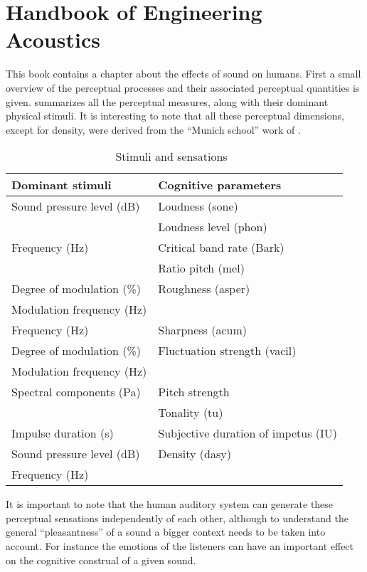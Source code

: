 \documentclass%
  [/Users/rodrigo/Documents/TUe/thesis/latex/topic/fluctuation_strength/
  literature_review.tex]
  {subfiles}
\begin{document}
\section{Handbook of Engineering Acoustics}

This book contains a chapter about the effects of sound on humans. First a small
overview of the perceptual processes and their associated perceptual quantities
is given.  summarizes all the perceptual measures, along with
their dominant physical stimuli. It is interesting to note that all these
perceptual dimensions, except for density, were derived from the
``Munich school'' work of \citet{Fastl2007Psychoacoustics}.

\begin{table}[ht]
  \centering
  \begin{tabular}{ l l }
    \toprule
    \textbf{Dominant stimuli} & \textbf{Cognitive parameters} \\
    \midrule
    Sound pressure level (dB) & Loudness (sone) \\
    \cmidrule{2-2}
    & Loudness level (phon) \\
    \midrule
    Frequency (Hz) & Critical band rate (Bark) \\
    \cmidrule{2-2}
    & Ratio pitch (mel) \\
    \midrule
    Degree of modulation (\%) & Roughness (asper)\\
    \cmidrule{1-1}
    Modulation frequency (Hz) & \\
    \midrule
    Frequency (Hz) & Sharpness (acum) \\
    \midrule
    Degree of modulation (\%) & Fluctuation strength (vacil) \\
    \cmidrule{1-1}
    Modulation frequency (Hz) & \\
    \midrule
    Spectral components (Pa) & Pitch strength \\
    \cmidrule{2-2}
    & Tonality (tu) \\
    \midrule
    Impulse duration (s) & Subjective duration of impetus (IU) \\
    \midrule
    Sound pressure level (dB) & Density (dasy) \\
    Frequency (Hz) & \\
    \bottomrule
  \end{tabular}
  \caption{Stimuli and sensations~\cite[pp.~70]{Mueller2012Handbook}}
\label{tab:stimsens}
\end{table}

It is important to note that the human auditory system can generate these
perceptual sensations independently of each other, although to understand the
general ``pleasantness'' of a sound a bigger context needs to be taken into
account. For instance the emotions of the listeners can have an important
effect on the cognitive construal of a given sound.
\end{document}
